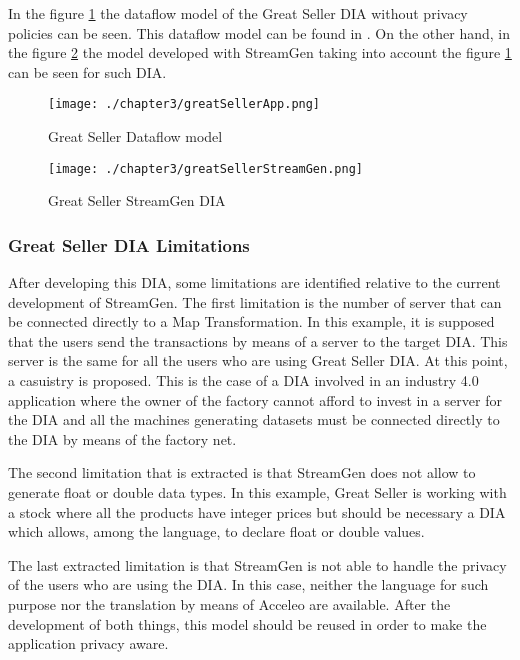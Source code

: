 In the figure \ref{fig:Great Seller Dataflow model} the dataflow model of the Great Seller DIA without privacy policies can be seen. This dataflow model can be found in \cite{privacypoliciesarticle}. On the other hand, in the figure \ref{fig:Great Seller StreamGen DIA} the model developed with StreamGen taking into account the figure \ref{fig:Great Seller Dataflow model} can be seen for such DIA.

\begin{figure}
\centering
{\texttt{[image: ./chapter3/greatSellerApp.png]}}
\caption{Great Seller Dataflow model}
\label{fig:Great Seller Dataflow model}
\end{figure}

\begin{figure}
\centering
{\texttt{[image: ./chapter3/greatSellerStreamGen.png]}}
\caption{Great Seller StreamGen DIA}
\label{fig:Great Seller StreamGen DIA}
\end{figure}

\subsubsection*{Great Seller DIA Limitations}

After developing this DIA, some limitations are identified relative to the current development of StreamGen. The first limitation is the number of server that can be connected directly to a Map Transformation. In this example, it is supposed that the users send the transactions by means of a server to the target DIA. This server is the same for all the users who are using Great Seller DIA. At this point, a casuistry is proposed. This is the case of a DIA involved in an industry 4.0 application where the owner of the factory cannot afford to invest in a server for the DIA and all the machines generating datasets must be connected directly to the DIA by means of the factory net.

The second limitation that is extracted is that StreamGen does not allow to generate float or double data types. In this example, Great Seller is working with a stock where all the products have integer prices but should be necessary a DIA which allows, among the language, to declare float or double values.

The last extracted limitation is that StreamGen is not able to handle the privacy of the users who are using the DIA. In this case, neither the language for such purpose nor the translation by means of Acceleo are available. After the development of both things, this model should be reused in order to make the application privacy aware.

